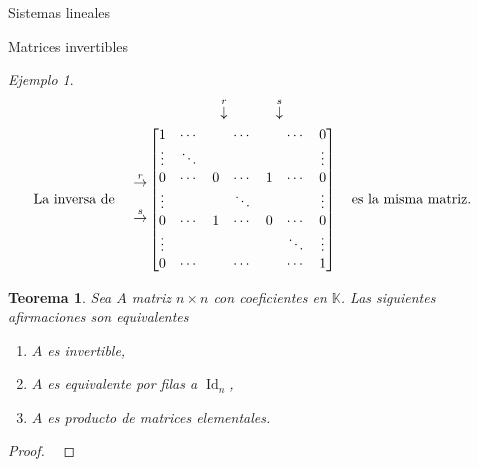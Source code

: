 \documentclass[a4paper,12pt,twoside,spanish,reqno]{amsbook}
\numberwithin{equation}{section}
\newtheorem{teorema}{Teorema}[section]
\theoremstyle{definition}
\theoremstyle{remark}
\newtheorem*{ejemplo*}{Ejemplo}
\newcommand{\Id}{\operatorname{Id}}
\newcommand{\K}{\mathbb K}
\begin{document}
\begin{chapter}{Sistemas lineales}
\begin{section}{Matrices invertibles}
\begin{ejemplo*}
            \begin{align*}
            &\begin{matrix}
            {}^{}&{}^{}&{}^{}&{}^{}&{}^{}&\overset{r}{\downarrow}&{}^{}&{}^{}&{}^{}{}^{}\overset{s}{\downarrow}&{}^{}
            \end{matrix} \\
            \text{La inversa de \quad}\begin{matrix}
            {}^{}\\{}^{}\\
            \overset{r}{\to}\\
            {}^{}\\
            \overset{s}{\to}\\{}^{}\\
            {}^{}
            \end{matrix}
            &\begin{bmatrix}
            1 & \cdots &  &\cdots &&\cdots& 0  \\
            \vdots  & \ddots  & & &&& \vdots \\
            0 & \cdots &0 &\cdots&1&\cdots &0 \\
            \vdots  &   & &\ddots &&& \vdots \\
            0  & \cdots  &1 &\cdots &0& \cdots& 0 \\
            \vdots  &   & & &&\ddots& \vdots \\
            0  & \cdots  & &\cdots &&\cdots& 1
            \end{bmatrix}
            \text{\quad es la misma matriz.\quad}
            \end{align*}
        
                        
        
    
\end{ejemplo*}
        
        
            
            
            \begin{teorema}\label{mtrx-inv-equiv} Sea $A$ matriz $n \times n$ con coeficientes en $\K$. Las siguientes afirmaciones son equivalentes
                \begin{enumerate}
                    \item[\textit{i})] $A$ es invertible,
                    \item[\textit{ii})] $A$  es equivalente por filas a $\Id_n$, 
                    \item[\textit{iii})] $A$ es producto de matrices elementales.
                \end{enumerate}
            \end{teorema}
            \begin{proof}
                \


\end{proof}
\end{section}
\end{chapter}
\end{document}
